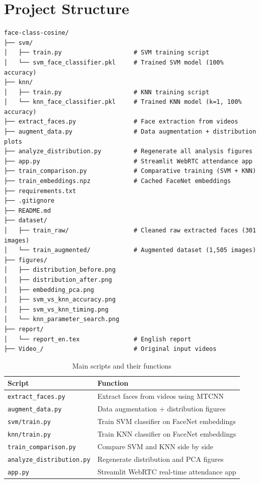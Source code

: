 \documentclass[12pt,a4paper]{article}
\begin{document}
\newpage

\section{Project Structure}
\label{sec:project_structure}

\begin{verbatim}
face-class-cosine/
├── svm/
│   ├── train.py                    # SVM training script
│   └── svm_face_classifier.pkl     # Trained SVM model (100% accuracy)
├── knn/
│   ├── train.py                    # KNN training script
│   └── knn_face_classifier.pkl     # Trained KNN model (k=1, 100% accuracy)
├── extract_faces.py                # Face extraction from videos
├── augment_data.py                 # Data augmentation + distribution plots
├── analyze_distribution.py         # Regenerate all analysis figures
├── app.py                          # Streamlit WebRTC attendance app
├── train_comparison.py             # Comparative training (SVM + KNN)
├── train_embeddings.npz            # Cached FaceNet embeddings
├── requirements.txt
├── .gitignore
├── README.md
├── dataset/
│   ├── train_raw/                  # Cleaned raw extracted faces (301 images)
│   └── train_augmented/            # Augmented dataset (1,505 images)
├── figures/
│   ├── distribution_before.png
│   ├── distribution_after.png
│   ├── embedding_pca.png
│   ├── svm_vs_knn_accuracy.png
│   ├── svm_vs_knn_timing.png
│   └── knn_parameter_search.png
├── report/
│   └── report_en.tex               # English report
├── Video_/                         # Original input videos
\end{verbatim}

\begin{table}[H]
    \centering
    \caption{Main scripts and their functions}
    \label{tab:scripts}
    \begin{tabular}{l l}
        \toprule
        \textbf{Script} & \textbf{Function} \\
        \midrule
        \texttt{extract\_faces.py} & Extract faces from videos using MTCNN \\
        \texttt{augment\_data.py}  & Data augmentation + distribution figures \\
        \texttt{svm/train.py}      & Train SVM classifier on FaceNet embeddings \\
        \texttt{knn/train.py}      & Train KNN classifier on FaceNet embeddings \\
        \texttt{train\_comparison.py} & Compare SVM and KNN side by side \\
        \texttt{analyze\_distribution.py} & Regenerate distribution and PCA figures \\
        \texttt{app.py}           & Streamlit WebRTC real-time attendance app \\
        \bottomrule
    \end{tabular}
\end{table}
\end{document}
